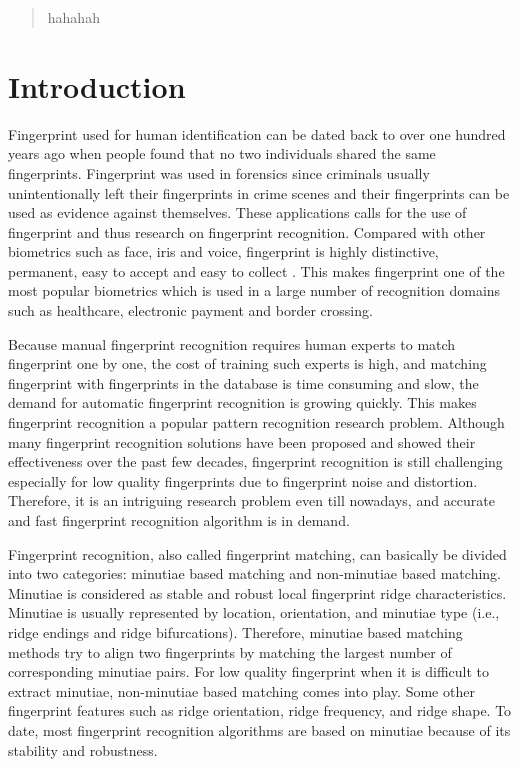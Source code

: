 \documentclass[12pt, a4paper]{article}
\begin{document}
\begin{spacing}{1} 

    \begin{abstract}
    hahahah
    \end{abstract}

    \section{Introduction}
    Fingerprint used for human identification can be dated back to over one hundred years ago when people found that no two individuals shared the same fingerprints. Fingerprint was used in forensics  since criminals usually unintentionally left their fingerprints in crime scenes and their fingerprints can be used as evidence against themselves. These applications calls for the use of fingerprint and thus research on fingerprint recognition. Compared with other biometrics such as face, iris and voice, fingerprint is highly distinctive, permanent, easy to accept and easy to collect \cite{Maltoni2009}. This makes fingerprint one of the most popular biometrics which is used in a large number of recognition domains such as healthcare, electronic payment and border crossing.
    
    Because manual fingerprint recognition requires human experts to match fingerprint one by one, the cost of training such experts is high, and matching fingerprint with fingerprints in the database is time consuming and slow, the demand for automatic fingerprint recognition is growing quickly. This makes fingerprint recognition a popular pattern recognition research problem. Although many fingerprint recognition solutions have been proposed and showed their effectiveness over the past few decades, fingerprint recognition is still challenging especially for low quality fingerprints due to fingerprint noise and distortion. Therefore, it is an intriguing  research problem even till nowadays, and accurate and fast fingerprint recognition algorithm is in demand.
    
    Fingerprint recognition, also called fingerprint matching, can basically be divided into two categories: minutiae based matching and non-minutiae based matching. Minutiae is considered as stable and robust local fingerprint ridge characteristics. Minutiae is usually represented by location, orientation, and minutiae type (i.e., ridge endings and ridge bifurcations). Therefore, minutiae based matching methods try to align two fingerprints by matching the largest number of corresponding minutiae pairs. For low quality fingerprint when it is difficult to extract minutiae, non-minutiae based matching comes into play. Some other fingerprint features such as ridge orientation, ridge frequency,  and ridge shape. To date, most fingerprint recognition algorithms are based on minutiae because of its stability and robustness.
    

\end{spacing}
\end{document}
